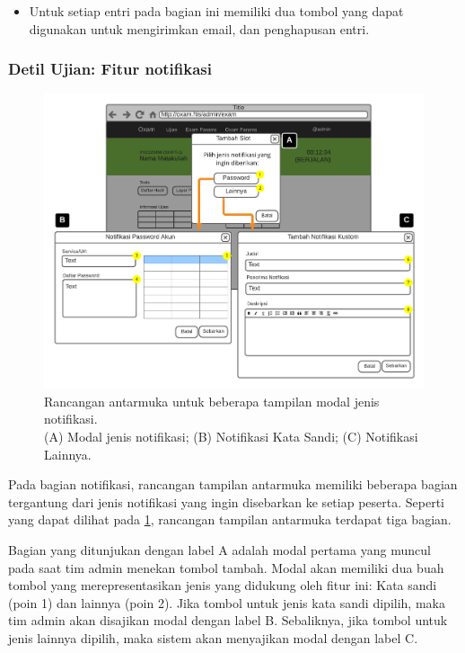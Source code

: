 \begin{itemize}
\begin{itemize}
                \item Untuk setiap entri pada bagian ini memiliki dua tombol
                    yang dapat digunakan untuk mengirimkan email, dan
                    penghapusan entri.
           \end{itemize}
    \end{itemize}
    
\subsubsection{Detil Ujian: Fitur notifikasi}
    \begin{figure}
        \centering
        \includegraphics{Gambar/mockups/Mockup--Admin - Notif.pdf}
        \caption{Rancangan antarmuka untuk beberapa tampilan modal jenis
        notifikasi. \\
            (A) Modal jenis notifikasi; (B) Notifikasi Kata Sandi; (C)
            Notifikasi Lainnya.}
        \label{fig:mockup_admin_exam_det_notif}
    \end{figure}
    
    Pada bagian notifikasi, rancangan tampilan antarmuka memiliki beberapa
    bagian tergantung dari jenis notifikasi yang ingin disebarkan ke setiap
    peserta. Seperti yang dapat dilihat pada
    \ref{fig:mockup_admin_exam_det_notif}, rancangan tampilan antarmuka terdapat
    tiga bagian.
    
    Bagian yang ditunjukan dengan label A adalah modal pertama yang muncul pada
    saat tim admin menekan tombol tambah. Modal akan memiliki dua buah tombol
    yang merepresentasikan jenis yang didukung oleh fitur ini: Kata sandi (poin
    1) dan lainnya (poin 2). Jika tombol untuk jenis kata sandi dipilih, maka
    tim admin akan disajikan modal dengan label B. Sebaliknya, jika tombol untuk
    jenis lainnya dipilih, maka sistem akan menyajikan modal dengan label C.
    
